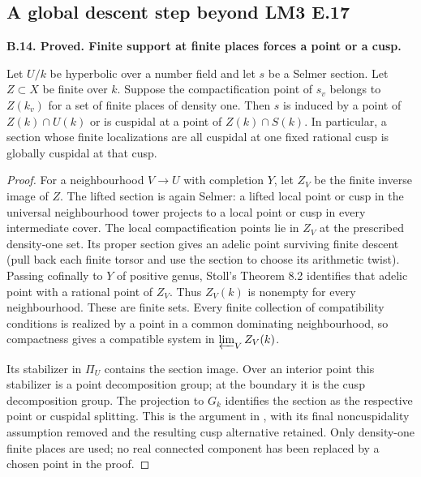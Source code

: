 \documentclass[11pt,oneside]{article}
\makeatletter
\newcounter{statementanchor}
\newenvironment{statement}[3]{%
 \refstepcounter{statementanchor}\def\@currentlabel{#1}%
 \par\addvspace{9pt}\noindent
 \textbf{#1. #2. #3.}\par\nobreak\noindent\ignorespaces
}{\par\addvspace{5pt}}
\makeatother
\begin{document}
\subsection{A global descent step beyond LM3 E.17}

\begin{statement}{B.14}{Proved}{Finite support at finite places forces a point or a cusp}
\label{st:B.14}

Let $U/k$ be hyperbolic over a number field and let $s$ be a Selmer
section.  Let $Z\subset X$ be finite over $k$.  Suppose the
compactification point of $s_v$ belongs to $Z(k_v)$ for a set of
finite places of density one.  Then $s$ is induced by a point of
$Z(k)\cap U(k)$ or is cuspidal at a point of $Z(k)\cap S(k)$.
In particular, a section whose finite localizations are all
cuspidal at one fixed rational cusp is globally cuspidal at that cusp.
\end{statement}
\begin{proof}
For a neighbourhood $V\to U$ with completion $Y$, let $Z_V$ be the
finite inverse image of $Z$.  The lifted section is again Selmer:
a lifted local point or cusp in the universal neighbourhood tower
projects to a local point or cusp in every intermediate cover.
The local compactification points lie in $Z_V$ at the prescribed
density-one set.  Its proper section gives an adelic point surviving
finite descent (pull back each finite torsor and use the section to
choose its arithmetic twist).  Passing cofinally to $Y$ of positive
genus, Stoll's Theorem 8.2 \cite{B_Stoll} identifies that adelic point
with a rational point of $Z_V$.  Thus $Z_V(k)$ is nonempty for every
neighbourhood.  These are finite sets.  Every finite collection of
compatibility conditions is realized by a point in a common
dominating neighbourhood, so compactness gives a compatible system
in $\varprojlim_V Z_V(k)$.

Its stabilizer in $\Pi_U$ contains the section image.  Over an
interior point this stabilizer is a point decomposition group; at
the boundary it is the cusp decomposition group.  The projection
to $G_k$ identifies the section as the respective point or
cuspidal splitting.  This is the argument in
\cite[\S3, proof of Corollary 5]{B_StixLocal}, with its final
noncuspidality assumption removed and the resulting cusp alternative
retained.  Only density-one finite places are used; no real
connected component has been replaced by a chosen point in the proof.
\end{proof}
\end{document}
